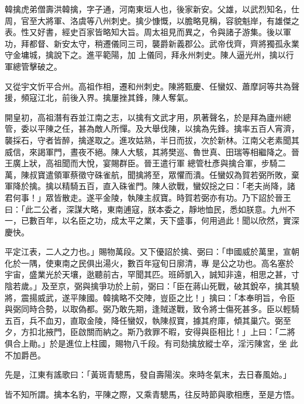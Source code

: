 
\begin{pinyinscope}

 韓擒虎弟僧壽洪韓擒，字子通，河南東垣人也，後家新安。父雄，以武烈知名，仕周，官至大將軍、洛虞等八州刺史。擒少慷慨，以膽略見稱，容貌魁岸，有雄傑之表。性又好書，經史百家皆略知大旨。周太祖見而異之，令與諸子游集。後以軍功，拜都督、新安太守，稍遷儀同三司，襲爵新義郡公。武帝伐齊，齊將獨孤永業守金墉城，擒說下之。進平範陽，加
 上儀同，拜永州刺史。陳人逼光州，擒以行軍總管擊破之。



 又從宇文忻平合州。高祖作相，遷和州刺史。陳將甄慶、任蠻奴、蕭摩訶等共為聲援，頻寇江北，前後入界。擒屢挫其鋒，陳人奪氣。



 開皇初，高祖潛有吞並江南之志，以擒有文武才用，夙著聲名，於是拜為廬州總管，委以平陳之任，甚為敵人所憚。及大舉伐陳，以擒為先鋒。擒率五百人宵濟，襲採石，守者皆醉，擒遂取之。進攻姑熟，半日而拔，次於新林。江南父老素聞其威信，來謁軍門，晝夜不絕。陳人大駭，其將樊巡、魯世真、田瑞等相繼降之。晉王廣上狀，高祖聞而大悅，宴賜群臣。晉王遣行軍
 總管杜彥與擒合軍，步騎二萬，陳叔寶遣領軍蔡徵守硃雀航，聞擒將至，眾懼而潰。任蠻奴為賀若弼所敗，棄軍降於擒。擒以精騎五百，直入硃雀門。陳人欲戰，蠻奴捴之曰：「老夫尚降，諸君何事！」眾皆散走。遂平金陵，執陳主叔寶。時賀若弼亦有功。乃下詔於晉王曰：「此二公者，深謀大略，東南逋寇，朕本委之，靜地恤民，悉如朕意。九州不一，已數百年，以名臣之功，成太平之業，天下盛事，何用過此！聞以欣然，實深慶快。



 平定江表，二人之力也。」賜物萬段。又下優詔於擒、弼曰：「申國威於萬里，宣朝化於一隅，使東南之民俱出湯火，數百年寇旬日廓清，專
 是公之功也。高名塞於宇宙，盛業光於天壤，逖聽前古，罕聞其匹。班師凱入，誠知非遠，相思之甚，寸陰若歲。」及至京，弼與擒爭功於上前，弼曰：「臣在蔣山死戰，破其銳卒，擒其驍將，震揚威武，遂平陳國。韓擒略不交陣，豈臣之比！」擒曰：「本奉明旨，令臣與弼同時合勢，以取偽都。弼乃敢先期，逢賊遂戰，致令將士傷死甚多。臣以輕騎五百，兵不血刃，直取金陵，降任蠻奴，執陳叔寶，據其府庫，傾其巢穴。弼至夕，方扣北掖門，臣啟關而納之。斯乃救罪不暇，安得與臣相比！」上曰：「二將俱合上勛。」於是進位上柱國，賜物八千段。有司劾擒放縱士卒，淫污陳宮，坐
 此不加爵邑。



 先是，江東有謠歌曰：「黃斑青驄馬，發自壽陽涘。來時冬氣末，去日春風始。」



 皆不知所謂。擒本名豹，平陳之際，又乘青驄馬，往反時節與歌相應，至是方悟。




\end{pinyinscope}
